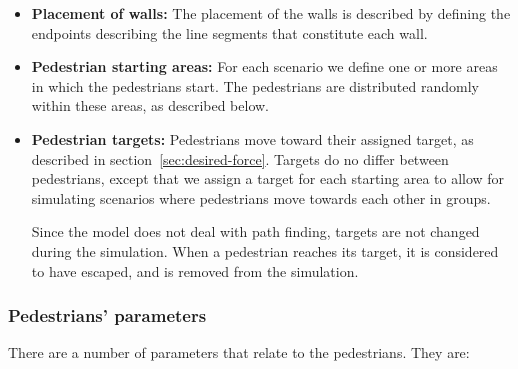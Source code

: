 \begin{itemize}
    \item \textbf{Placement of walls:} The placement of the walls is described 
        by defining the endpoints describing the line segments that 
        constitute each wall.

    \item \textbf{Pedestrian starting areas:} For each scenario we define one 
        or more areas in which the pedestrians start. The pedestrians are 
        distributed randomly within these areas, as described below.

    \item \textbf{Pedestrian targets:}  Pedestrians move toward their 
        assigned target, as described in section~\ref{sec:desired-force}. 
        Targets do no differ between pedestrians, except that we assign a 
        target for each starting area to allow for simulating scenarios where 
        pedestrians move towards each other in groups.

        Since the model does not deal with path finding, targets are not 
        changed during the simulation. When a pedestrian reaches its target, 
        it is considered to have escaped, and is removed from the simulation.
\end{itemize}


\subsubsection{Pedestrians' parameters}
\label{sec:init-pedestrians}
There are a number of parameters that relate to the pedestrians. They are:

